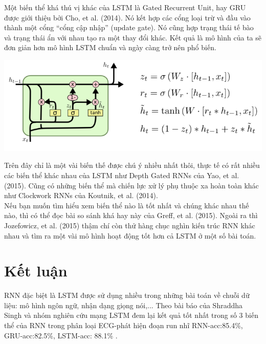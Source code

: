 Một biến thể khá thú vị khác của LSTM là Gated Recurrent Unit, hay GRU được giới thiệu bởi Cho, et al. (2014). Nó kết hợp các cổng loại trừ và đầu vào thành một cổng “cổng cập nhập” (update gate). Nó cũng hợp trạng thái tế bào và trạng thái ẩn với nhau tạo ra một thay đổi khác. Kết quả là mô hình của ta sẽ đơn giản hơn mô hình LSTM chuẩn và ngày càng trở nên phổ biến.
\begin{center}
    \includegraphics[scale=.5]{image/chapter6/bth3.png}
    \begin{figure}[htp]
    \begin{center}
     
    \end{center}
    \end{figure}
\end{center}
Trên đây chỉ là một vài biến thế được chú ý nhiều nhất thôi, thực tế có rất nhiều các biến thể khác nhau của LSTM như Depth Gated RNNs của Yao, et al. (2015). Cũng có những biến thể mà chiến lực xử lý phụ thuộc xa hoàn toàn khác như Clockwork RNNs của Koutnik, et al. (2014).\\
Nếu bạn muốn tìm hiểu xem biến thể nào là tốt nhất và chúng khác nhau thế nào, thì có thể đọc bài so sánh khá hay này của Greff, et al. (2015). Ngoài ra thì Jozefowicz, et al. (2015) thậm chí còn thử hàng chục nghìn kiến trúc RNN khác nhau và tìm ra một vài mô hình hoạt động tốt hơn cả LSTM ở một số bài toán.


\section{Kết luận}
RNN đặc biệt là LSTM được sử dụng nhiều trong những bài toán về chuỗi dữ liệu: mô hình ngôn ngữ, nhận dạng giọng nói,... Theo bài báo của Shraddha Singh và nhóm nghiên cứu mạng LSTM đem lại kết quả tốt nhất trong số 3 biến thể của RNN trong phân loại ECG-phát hiện đoạn run nhĩ RNN-acc:85.4\%, GRU-acc:82.5\%, LSTM-acc: 88.1\% \cite{ketluanlstm}.
